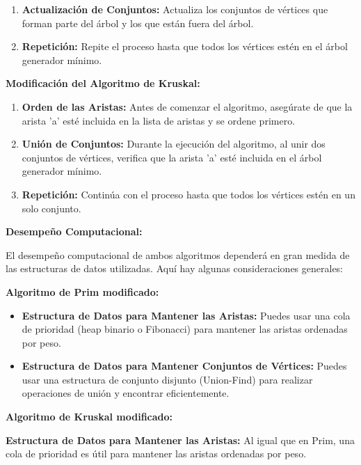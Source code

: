 \documentclass[answers, 11pt]{exam}
\begin{document}
\begin{questions}
\begin{solution}
\begin{enumerate}
  \item \textbf{Actualización de Conjuntos:}
  Actualiza los conjuntos de vértices que forman parte del árbol y los que están 
  fuera del árbol.

  \item \textbf{Repetición:}
  Repite el proceso hasta que todos los vértices estén en el árbol generador mínimo.
\end{enumerate}

\textbf{Modificación del Algoritmo de Kruskal:}

\begin{enumerate}
  \item \textbf{Orden de las Aristas:}
  Antes de comenzar el algoritmo, asegúrate de que la arista 'a' esté incluida 
  en la lista de aristas y se ordene primero.

  \item \textbf{Unión de Conjuntos:}
  Durante la ejecución del algoritmo, al unir dos conjuntos de vértices, verifica 
  que la arista 'a' esté incluida en el árbol generador mínimo.

  \item \textbf{Repetición:}
  Continúa con el proceso hasta que todos los vértices estén en un solo conjunto.

\end{enumerate}

\textbf{Desempeño Computacional:}

El desempeño computacional de ambos algoritmos dependerá en gran medida de las 
estructuras de datos utilizadas. Aquí hay algunas consideraciones generales:

\textbf{Algoritmo de Prim modificado:}

\begin{itemize}
  \item \textbf{Estructura de Datos para Mantener las Aristas:}
  Puedes usar una cola de prioridad (heap binario o Fibonacci) para mantener las 
  aristas ordenadas por peso.
  
  \item \textbf{Estructura de Datos para Mantener Conjuntos de Vértices:}
  Puedes usar una estructura de conjunto disjunto (Union-Find) para realizar 
  operaciones de unión y encontrar eficientemente.
\end{itemize}

\textbf{Algoritmo de Kruskal modificado:}

\textbf{Estructura de Datos para Mantener las Aristas:}
  Al igual que en Prim, una cola de prioridad es útil para mantener las aristas 
  ordenadas por peso.


\end{solution}
\end{questions}
\end{document}
